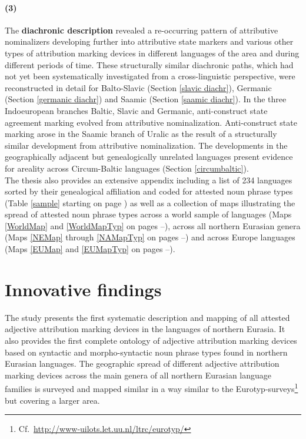 \paragraph{(3)} The {\bf diachronic description} revealed a re-occurring pattern of attributive nominalizers developing further into attributive state markers and various other types of attribution marking devices in different languages of the area and during different periods of time. These structurally similar diachronic paths, which had not yet been systematically investigated from a cross-linguistic perspective, were reconstructed in detail for Balto-Slavic (Section \ref{slavic diachr}), Germanic (Section \ref{germanic diachr}) and Saamic (Section \ref{saamic diachr}). In the three Indoeuropean branches Baltic, Slavic and Germanic, anti-construct state agreement marking evolved from attributive nominalization. Anti-construct state marking arose in the Saamic branch of Uralic as the result of a structurally similar development from attributive nominalization. The developments in the geographically adjacent but genealogically unrelated languages present evidence for areality across Circum-Baltic languages (Section \ref{circumbaltic}).\\

\noindent The thesis also provides an extensive appendix including a list of 234 languages sorted by their genealogical affiliation and coded for attested noun phrase types (Table \ref{sample} starting on page \pageref{sample}) as well as a collection of maps illustrating the spread of attested noun phrase types across a world sample of languages (Maps \ref{WorldMap} and \ref{WorldMapTyp} on pages \pageref{WorldMap}–\pageref{WorldMapTyp}), across all northern Eurasian genera (Maps \ref{NEMap} through \ref{NAMapTyp} on pages \pageref{NEMap}–\pageref{NAMapTyp}) and across Europe languages (Maps \ref{EUMap} and \ref{EUMapTyp} on pages \pageref{EUMap}–\pageref{EUMapTyp}).

\section{Innovative findings}

The study presents the first systematic description and mapping of all attested adjective attribution marking devices in the languages of northern Eurasia. It also provides the first complete ontology of adjective attribution marking devices based on syntactic and morpho-syntactic noun phrase types found in northern Eurasian languages. The geographic spread of different adjective attribution marking devices across the main genera of all northern Eurasian language families is surveyed and mapped similar in a way similar to the Eurotyp-surveys\footnote{Cf.~\url{http://www-uilots.let.uu.nl/ltrc/eurotyp/}} but covering a larger area. 

